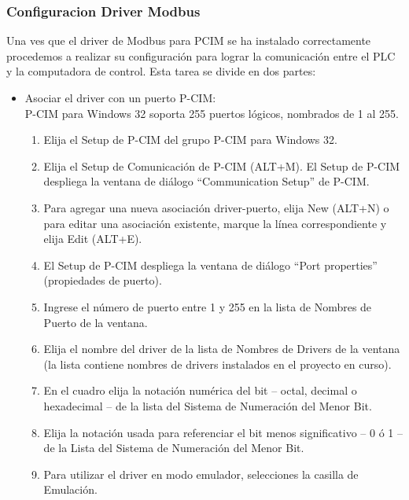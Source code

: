 
\subsubsection{Configuracion Driver Modbus}
Una ves que el driver de Modbus para PCIM se ha instalado correctamente procedemos a realizar su 
configuración para lograr la comunicación entre el PLC y la computadora de control. Esta tarea se
divide en dos partes: 
\begin{itemize}
 \item Asociar el driver con un puerto P-CIM:\\
 P-CIM para Windows 32 soporta 255 puertos lógicos, nombrados de 1 al 255.
 \begin{enumerate}
  \item Elija el Setup de P-CIM del grupo P-CIM para Windows 32.
  \item  Elija el Setup de Comunicación de P-CIM (ALT+M). El Setup de P-CIM
despliega la ventana de diálogo “Communication Setup” de P-CIM.
  \item Para agregar una nueva asociación driver-puerto, elija New (ALT+N) o para
  editar una asociación existente, marque la línea correspondiente y
  elija Edit (ALT+E).
  \item El Setup de P-CIM despliega la ventana de diálogo “Port properties” (propiedades
  de puerto).
  \item Ingrese el número de puerto entre 1 y 255 en la lista de Nombres de Puerto de
  la ventana.
  \item Elija el nombre del driver de la lista de Nombres de Drivers de la ventana (la
  lista contiene nombres de drivers instalados en el proyecto en curso).
  \item En el cuadro elija la notación numérica del bit – octal, decimal o hexadecimal –
  de la lista del Sistema de Numeración del Menor Bit.
  \item Elija la notación usada para referenciar el bit menos significativo – 0 ó 1 – de la
  Lista del Sistema de Numeración del Menor Bit.
  \item Para utilizar el driver en modo emulador, selecciones la casilla de Emulación.
 \end{enumerate}


\end{itemize}
